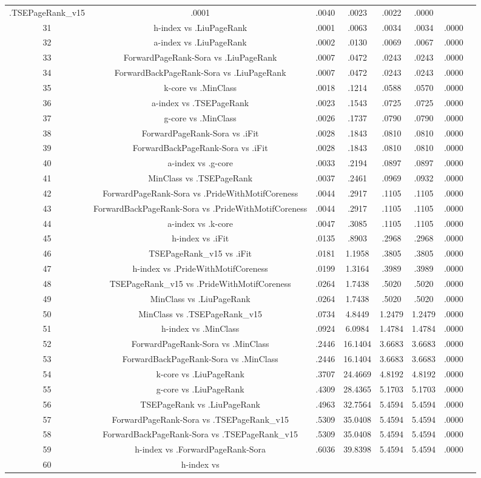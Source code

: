 \documentclass[a4paper,10pt]{article}
\begin{document}
\begin{landscape}
\begin{table}[!htp]
\begin{tabular}{cccccccc}
.TSEPageRank_v15&.0001&.0040&.0023&.0022&.0000\\31&h-index vs .LiuPageRank&.0001&.0063&.0034&.0034&.0000\\32&a-index vs .LiuPageRank&.0002&.0130&.0069&.0067&.0000\\33&ForwardPageRank-Sora vs .LiuPageRank&.0007&.0472&.0243&.0243&.0000\\34&ForwardBackPageRank-Sora vs .LiuPageRank&.0007&.0472&.0243&.0243&.0000\\35&k-core vs .MinClass&.0018&.1214&.0588&.0570&.0000\\36&a-index vs .TSEPageRank&.0023&.1543&.0725&.0725&.0000\\37&g-core vs .MinClass&.0026&.1737&.0790&.0790&.0000\\38&ForwardPageRank-Sora vs .iFit&.0028&.1843&.0810&.0810&.0000\\39&ForwardBackPageRank-Sora vs .iFit&.0028&.1843&.0810&.0810&.0000\\40&a-index vs .g-core&.0033&.2194&.0897&.0897&.0000\\41&MinClass vs .TSEPageRank&.0037&.2461&.0969&.0932&.0000\\42&ForwardPageRank-Sora vs .PrideWithMotifCoreness&.0044&.2917&.1105&.1105&.0000\\43&ForwardBackPageRank-Sora vs .PrideWithMotifCoreness&.0044&.2917&.1105&.1105&.0000\\44&a-index vs .k-core&.0047&.3085&.1105&.1105&.0000\\45&h-index vs .iFit&.0135&.8903&.2968&.2968&.0000\\46&TSEPageRank_v15 vs .iFit&.0181&1.1958&.3805&.3805&.0000\\47&h-index vs .PrideWithMotifCoreness&.0199&1.3164&.3989&.3989&.0000\\48&TSEPageRank_v15 vs .PrideWithMotifCoreness&.0264&1.7438&.5020&.5020&.0000\\49&MinClass vs .LiuPageRank&.0264&1.7438&.5020&.5020&.0000\\50&MinClass vs .TSEPageRank_v15&.0734&4.8449&1.2479&1.2479&.0000\\51&h-index vs .MinClass&.0924&6.0984&1.4784&1.4784&.0000\\52&ForwardPageRank-Sora vs .MinClass&.2446&16.1404&3.6683&3.6683&.0000\\53&ForwardBackPageRank-Sora vs .MinClass&.2446&16.1404&3.6683&3.6683&.0000\\54&k-core vs .LiuPageRank&.3707&24.4669&4.8192&4.8192&.0000\\55&g-core vs .LiuPageRank&.4309&28.4365&5.1703&5.1703&.0000\\56&TSEPageRank vs .LiuPageRank&.4963&32.7564&5.4594&5.4594&.0000\\57&ForwardPageRank-Sora vs .TSEPageRank_v15&.5309&35.0408&5.4594&5.4594&.0000\\58&ForwardBackPageRank-Sora vs .TSEPageRank_v15&.5309&35.0408&5.4594&5.4594&.0000\\59&h-index vs .ForwardPageRank-Sora&.6036&39.8398&5.4594&5.4594&.0000\\60&h-index vs 
\end{tabular}
\end{table}
\end{landscape}
\end{document}
